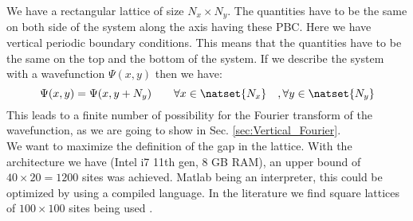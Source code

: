 \documentclass[../main.tex]{subfile}
\begin{document}
We have a rectangular lattice of size $N_x\times N_y$. The quantities have to be the same on both side of the system along the axis having these PBC.
Here we have vertical periodic boundary conditions. This means that the quantities have to be the same on the top and the bottom of the system. 
If we describe the system with a wavefunction $\Psi(x,y)$ then we have:
\begin{equation}
    \Psi(x,y) = \Psi(x,y+N_y) \quad\quad \forall x\in\natset{N_x}\quad, \forall y \in \natset{N_y}
\end{equation} 
This leads to a finite number of possibility for the Fourier transform of the wavefunction, as we are going to show in Sec. \ref{sec:Vertical_Fourier}.\\

We want to maximize the definition of the gap in the lattice. With the architecture we have (Intel i7 11th gen, 8 GB RAM),
an upper bound of $40\times20=1200$ sites was achieved. Matlab being an interpreter, this could be optimized by using a compiled language.
In the literature we find square lattices of $100\times100$ sites being used \cite{Mjos2019}. \\
\end{document}
